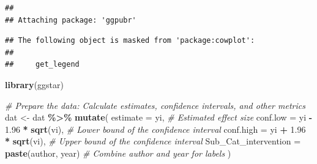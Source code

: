\documentclass[
]{book}
\newenvironment{Shaded}{\begin{snugshade}}{\end{snugshade}}
\newcommand{\AttributeTok}[1]{\textcolor[rgb]{0.13,0.29,0.53}{#1}}
\newcommand{\CommentTok}[1]{\textcolor[rgb]{0.56,0.35,0.01}{\textit{#1}}}
\newcommand{\FloatTok}[1]{\textcolor[rgb]{0.00,0.00,0.81}{#1}}
\newcommand{\FunctionTok}[1]{\textcolor[rgb]{0.13,0.29,0.53}{\textbf{#1}}}
\newcommand{\NormalTok}[1]{#1}
\newcommand{\OtherTok}[1]{\textcolor[rgb]{0.56,0.35,0.01}{#1}}
\newcommand{\SpecialCharTok}[1]{\textcolor[rgb]{0.81,0.36,0.00}{\textbf{#1}}}
\begin{document}
\begin{verbatim}
## 
## Attaching package: 'ggpubr'
\end{verbatim}

\begin{verbatim}
## The following object is masked from 'package:cowplot':
## 
##     get_legend
\end{verbatim}

\begin{Shaded}
\begin{Highlighting}[]
\FunctionTok{library}\NormalTok{(ggstar)}

\CommentTok{\# Prepare the data: Calculate estimates, confidence intervals, and other metrics}
\NormalTok{dat }\OtherTok{\textless{}{-}}\NormalTok{ dat }\SpecialCharTok{\%\textgreater{}\%}
  \FunctionTok{mutate}\NormalTok{(}
    \AttributeTok{estimate =}\NormalTok{ yi,  }\CommentTok{\# Estimated effect size}
    \AttributeTok{conf.low =}\NormalTok{ yi }\SpecialCharTok{{-}} \FloatTok{1.96} \SpecialCharTok{*} \FunctionTok{sqrt}\NormalTok{(vi),  }\CommentTok{\# Lower bound of the confidence interval}
    \AttributeTok{conf.high =}\NormalTok{ yi }\SpecialCharTok{+} \FloatTok{1.96} \SpecialCharTok{*} \FunctionTok{sqrt}\NormalTok{(vi),  }\CommentTok{\# Upper bound of the confidence interval}
    \AttributeTok{Sub\_Cat\_intervention =} \FunctionTok{paste}\NormalTok{(author, year)  }\CommentTok{\# Combine author and year for labels}
\NormalTok{  )}


\end{Highlighting}
\end{Shaded}
\end{document}

